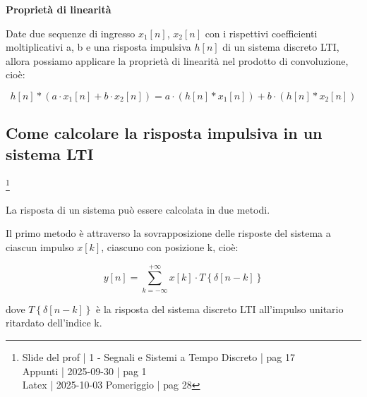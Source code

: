 \textbf{Proprietà di linearità} \newline 

Date due sequenze di ingresso $x_1 \left[ n\right]$, $x_2 \left[ n\right]$ con i rispettivi coefficienti moltiplicativi a, b e una risposta impulsiva $h \left[ n\right]$ di un sistema discreto LTI, 
allora possiamo applicare la proprietà di linearità nel prodotto di convoluzione, cioè: 

{
    \Large 
    \begin{equation}
        h \left[ n\right]
        *
        \left( 
            a 
            \cdot
            x_1 \left[ n\right] 
            +
            b 
            \cdot
            x_2 \left[ n\right]
        \right)
        = 
        a 
        \cdot 
        \left( 
        h \left[ n\right]
        *
        x_1 \left[ n\right]
        \right)
        +
        b 
        \cdot 
        \left(
        h \left[ n\right]
        *
        x_2 \left[ n\right]
        \right)
    \end{equation}
}

\newpage 

\subsection{Come calcolare la risposta impulsiva in un sistema LTI}

\footnote{ 
    Slide del prof | 1 - Segnali e Sistemi a Tempo Discreto | pag 17\\
    Appunti | 2025-09-30 | pag 1 \\ 
    Latex | 2025-10-03 Pomeriggio | pag 28
}

La risposta di un sistema può essere calcolata in due metodi. \newline 

Il primo metodo è attraverso la sovrapposizione delle risposte del sistema a ciascun impulso $x \left[ k\right]$, 
ciascuno con posizione k, cioè: 

{
    \Large 
    \begin{equation}
        y \left[ n\right]
        = 
        \sum_{k = - \infty}^{+ \infty}
        x \left[ k\right]
        \cdot 
        T \left\{ \delta \left[ n - k\right]\right\}
    \end{equation}
}

dove $T \left\{ \delta \left[ n - k\right]\right\}$ è la risposta del sistema discreto LTI all'impulso unitario ritardato dell'indice k. \newline 

